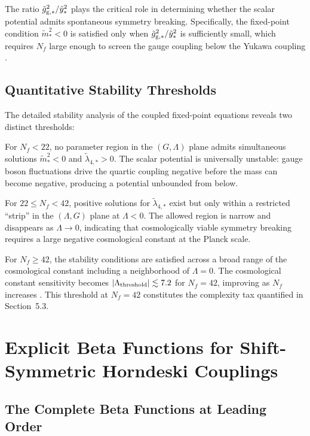 \documentclass[12pt,a4paper]{article}
\begin{document}
The ratio $\tilde g_{\rm g,*}^2 / \tilde y_*^2$ plays the critical role in
determining whether the scalar potential admits spontaneous symmetry breaking.
Specifically, the fixed-point condition $\tilde m^2_* < 0$ is satisfied only
when $\tilde g_{\rm g,*}^2 / \tilde y_*^2$ is sufficiently small, which requires
$N_f$ large enough to screen the gauge coupling below the Yukawa coupling
\cite{EichhornLinoMiqueleto2023}.

\subsection{Quantitative Stability Thresholds}

The detailed stability analysis of the coupled fixed-point equations reveals
two distinct thresholds:

For $N_f < 22$, no parameter region in the $(G,\Lambda)$ plane admits
simultaneous solutions $\tilde m^2_* < 0$ and $\tilde\lambda_{4,*} > 0$.
The scalar potential is universally unstable: gauge boson fluctuations drive
the quartic coupling negative before the mass can become negative, producing
a potential unbounded from below.

For $22 \leq N_f < 42$, positive solutions for $\tilde\lambda_{4,*}$ exist but
only within a restricted ``strip'' in the $(\Lambda, G)$ plane at $\Lambda < 0$.
The allowed region is narrow and disappears as $\Lambda \to 0$, indicating that
cosmologically viable symmetry breaking requires a large negative cosmological
constant at the Planck scale.

For $N_f \geq 42$, the stability conditions are satisfied across a broad range
of the cosmological constant including a neighborhood of $\Lambda = 0$. The
cosmological constant sensitivity becomes $|\Lambda_{\rm threshold}| \lesssim 7.2$
for $N_f = 42$, improving as $N_f$ increases \cite{EichhornLinoMiqueleto2023}.
This threshold at $N_f = 42$ constitutes the complexity tax quantified in Section~5.3.

\section{Explicit Beta Functions for Shift-Symmetric Horndeski Couplings}
\label{sec:horndeski_beta}

\subsection{The Complete Beta Functions at Leading Order}
\end{document}
